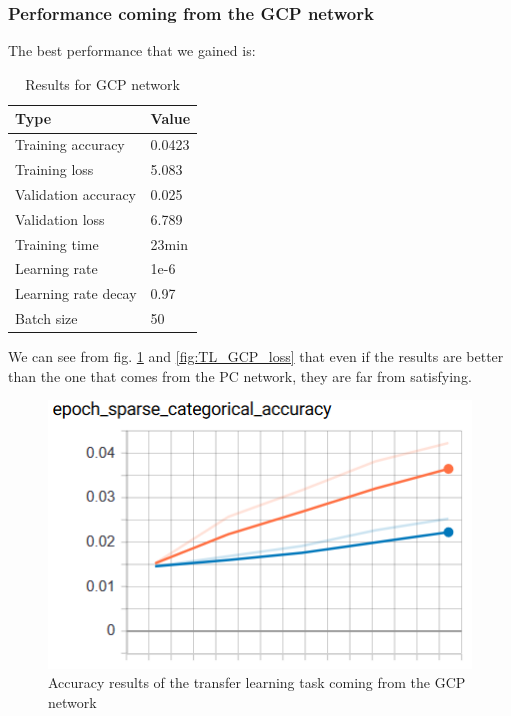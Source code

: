 \subsubsection{Performance coming from the GCP network}\label{sss:GCP_training}
The best performance that we gained is:
\begin{table}[!ht]
    \begin{center}
        \label{tab:GCP_early_results}
        \begin{tabular}{l|l}
            \rowcolor{gray!50}
            \textbf{Type} & \textbf{Value} \\
            \hline
            Training accuracy & 0.0423\\
            Training loss & 5.083\\
            Validation accuracy & 0.025\\
            Validation loss & 6.789\\
            Training time & 23min\\
            Learning rate & 1e-6\\
            Learning rate decay & 0.97\\
            Batch size & 50\\
            \hline
        \end{tabular}
    \end{center}
    \caption{Results for GCP network}
\end{table}
We can see from fig. \ref{fig:TL_GCP_acc} and \ref{fig:TL_GCP_loss} that even if the results are better than the one that comes from the PC network, they are far from satisfying.
\begin{figure}[!ht]
    \centering
    \includegraphics[scale=0.60]{images/TL_GCP_acc.png}
    \caption{Accuracy results of the transfer learning task coming from the GCP network}
    \label{fig:TL_GCP_acc}
\end{figure}
